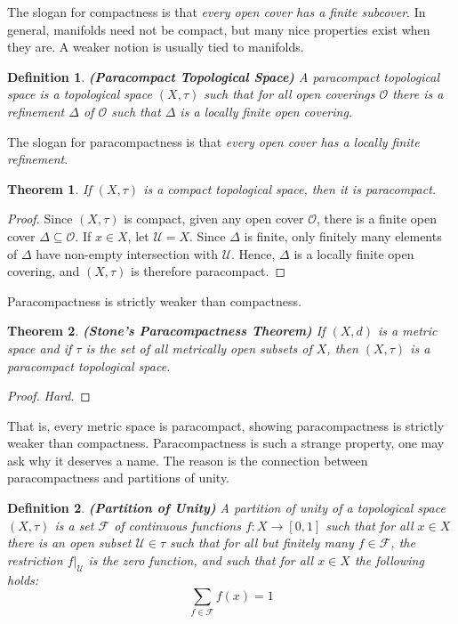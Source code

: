 \documentclass{article}
\theoremstyle{plain}
\newtheorem{theorem}{Theorem}[section]
\theoremstyle{normal}
\newtheorem{definition}{Definition}[section]
\begin{document}
        The slogan for compactness is that
        \textit{every open cover has a finite subcover}. In general, manifolds
        need not be compact, but many nice properties exist when they are.
        A weaker notion is usually tied to manifolds.
        \begin{definition}{\textbf{(Paracompact Topological Space)}}
            A paracompact topological space is a topological space $(X,\tau)$
            such that for all open coverings $\mathcal{O}$ there is a refinement
            $\Delta$ of $\mathcal{O}$ such that $\Delta$ is a locally finite
            open covering.
        \end{definition}
        The slogan for paracompactness is that
        \textit{every open cover has a locally finite refinement}.
        \begin{theorem}
            If $(X,\tau)$ is a compact topological space,
            then it is paracompact.
        \end{theorem}
        \begin{proof}
            Since $(X,\tau)$ is compact, given any open cover $\mathcal{O}$,
            there is a finite open cover $\Delta\subseteq\mathcal{O}$. If
            $x\in{X}$, let $\mathcal{U}=X$. Since $\Delta$ is finite, only
            finitely many elements of $\Delta$ have non-empty intersection with
            $\mathcal{U}$. Hence, $\Delta$ is a locally finite open covering,
            and $(X,\tau)$ is therefore paracompact.
        \end{proof}
        Paracompactness is strictly weaker than compactness.
        \begin{theorem}{\textbf{(Stone's Paracompactness Theorem)}}
            If $(X,d)$ is a metric space and if $\tau$ is the set of all
            metrically open subsets of $X$, then $(X,\tau)$ is a paracompact
            topological space.
        \end{theorem}
        \begin{proof}
            \textit{Hard}.
        \end{proof}
        That is, every metric space is paracompact, showing paracompactness is
        strictly weaker than compactness. Paracompactness is such a strange
        property, one may ask why it deserves a name. The reason is the
        connection between paracompactness and partitions of unity.
        \begin{definition}{\textbf{(Partition of Unity)}}
            A partition of unity of a topological space $(X,\tau)$ is a set
            $\mathcal{F}$ of continuous functions $f:X\rightarrow[0,1]$ such
            that for all $x\in{X}$ there is an open subset $\mathcal{U}\in\tau$
            such that for all but finitely many $f\in\mathcal{F}$, the
            restriction $f|_{\mathcal{U}}$ is the zero function, and such that
            for all $x\in{X}$ the following holds:
            \begin{equation}
                \sum_{f\in\mathcal{F}}f(x)=1
            \end{equation}
        \end{definition}
\end{document}
